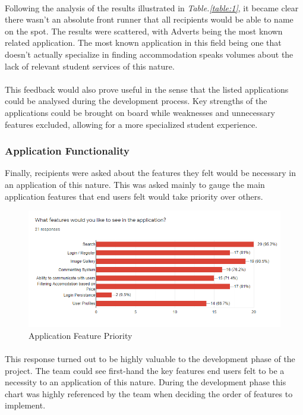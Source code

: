 \paragraph{}
Following the analysis of the results illustrated in \textit{Table.\ref{table:1}}, it became clear there wasn't an absolute front runner that all recipients would be able to name on the spot. The results were scattered, with Adverts being the most known related application. The most known application in this field being one that doesn't actually specialize in finding accommodation speaks volumes about the lack of relevant student services of this nature.

\paragraph{}
This feedback would also prove useful in the sense that the listed applications could be analysed during the development process. Key strengths of the applications could be brought on board while weaknesses and unnecessary features excluded, allowing for a more specialized student experience.

\subsubsection{Application Functionality}
Finally, recipients were asked about the features they felt would be necessary in an application of this nature. This was asked mainly to gauge the main application features that end users felt would take priority over others.

\begin{figure}[H]
	\caption{Application Feature Priority}
	\label{image:surveyInterest}
	\centering
	\includegraphics[width=1\textwidth]{images/survey_features.png}
\end{figure}

\paragraph{}
This response turned out to be highly valuable to the development phase of the project. The team could see first-hand the key features end users felt to be a necessity to an application of this nature. During the development phase this chart was highly referenced by the team when deciding the order of features to implement.

